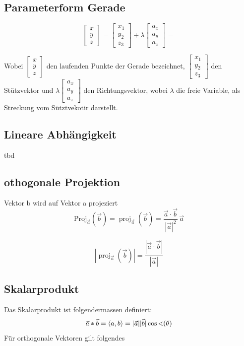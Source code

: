 \documentclass[10pt,a4paper,twocolumn]{article}
\begin{document}
	\subsection{Parameterform Gerade}
	$$ \begin{bmatrix} x \\ y \\ z \end{bmatrix} = \begin{bmatrix} x _1 \\ y_2 \\ z_3 \end{bmatrix} + \lambda\begin{bmatrix} a_x \\ a_y \\ a_z \end{bmatrix} = $$
	
	Wobei  $\begin{bmatrix} x \\ y \\ z \end{bmatrix}$ den laufenden Punkte der Gerade bezeichnet, $\begin{bmatrix} x _1 \\ y_2 \\ z_3 \end{bmatrix}$ den Stützvektor und $\lambda\begin{bmatrix} a_x \\ a_y \\ a_z \end{bmatrix}$ den Richtungsvektor, wobei $\lambda$ die freie Variable, als Streckung vom Sütztvekotir darstellt.
	\subsection{Lineare Abhängigkeit}
	tbd
	
	\subsection{othogonale Projektion}
	Vektor b wird auf Vektor a projeziert
	\[
	\text{Proj}_{\vec{a}}(\vec{b}) 
	= \operatorname{proj}_{\vec{a}}(\vec{b})
	= \frac{\vec{a}\cdot\vec{b}}{|\vec{a}|^2}\,\vec{a}
	\]
	
	\[
	\left|\operatorname{proj}_{\vec{a}}(\vec{b})\right|
	= \frac{|\vec{a}\cdot\vec{b}|}{|\vec{a}|}
	\]
	
	
	\subsection{Skalarprodukt}
	Das Skalarprodukt ist folgendermassen definiert:
	$$\vec{a}*\vec{b}=\braket{a,b}=|\vec{a}||\vec{b}|\cos\sphericalangle(\theta)$$
	Für orthogonale Vektoren gilt folgendes
	
\end{document}
